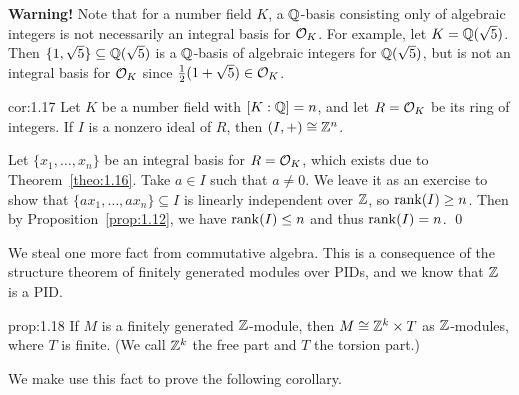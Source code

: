 {\bf Warning!} Note that for a number field $K$, a $\mathbb{Q}$-basis consisting only of 
algebraic integers is not necessarily an integral basis for ${\cal O}_K$. For 
example, let $K = \mathbb{Q}(\sqrt{5})$. Then $\{1, \sqrt{5}\} \subseteq 
\mathbb{Q}(\sqrt{5})$ is a $\mathbb{Q}$-basis of algebraic integers for $\mathbb{Q}(\sqrt{5})$, 
but is not an integral basis for ${\cal O}_K$ since $\frac12(1+\sqrt{5}) \in 
{\cal O}_K$. 

\begin{cor}{cor:1.17}
    Let $K$ be a number field with $[K : \mathbb{Q}] = n$, and let $R = {\cal O}_K$ be 
    its ring of integers. If $I$ is a nonzero ideal of $R$, then 
    $(I, +) \cong \mathbb{Z}^n$. 
\end{cor}\vspace{-0.25cm}
\begin{pf}
    Let $\{x_1, \dots, x_n\}$ be an integral basis for $R = {\cal O}_K$, 
    which exists due to Theorem~\ref{theo:1.16}. Take $a \in I$ such that 
    $a \neq 0$. We leave it as an exercise to show that 
    $\{ax_1, \dots, ax_n\} \subseteq I$ is linearly independent over $\mathbb{Z}$, 
    so $\operatorname{rank}(I) \geq n$. Then by Proposition~\ref{prop:1.12}, we have 
    $\operatorname{rank}(I) \leq n$ and thus $\operatorname{rank}(I) = n$. \qed 
\end{pf}\vspace{-0.25cm}

We steal one more fact from commutative algebra. This is a consequence of the 
structure theorem of finitely generated modules over PIDs, and we know that 
$\mathbb{Z}$ is a PID.

\begin{prop}{prop:1.18}
    If $M$ is a finitely generated $\mathbb{Z}$-module, then $M \cong \mathbb{Z}^k \times T$ 
    as $\mathbb{Z}$-modules, where $T$ is finite. (We call $\mathbb{Z}^k$ the free part and $T$ the 
    torsion part.)
\end{prop}\vspace{-0.25cm}

We make use this fact to prove the following corollary.

